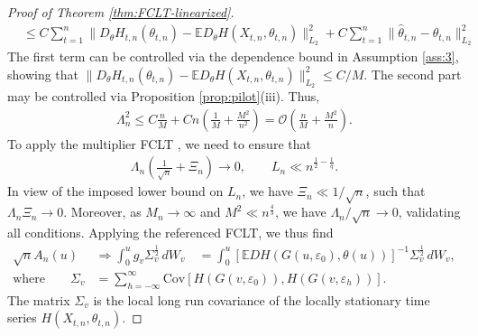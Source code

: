 \documentclass[10pt, a4paper]{article}
\theoremstyle{assumption}
\theoremstyle{definition}
\theoremstyle{theorem}
\newtheorem{theorem}{Theorem}[section]
\newcommand{\E}{\mathbb{E}}
\begin{document}
\begin{proof}[Proof of Theorem \ref{thm:FCLT-linearized}]
\begin{align*}
        &\leq C \sum_{t=1}^n \|D_\theta H_{t,n}({\theta}_{t,n}) - \E D_\theta H(X_{t,n},\theta_{t,n})\|_{L_2}^2 + C\sum_{t=1}^n \|\widehat{\theta}_{t,n}-\theta_{t,n}\|_{L_2}^2
    \end{align*}
    The first term can be controlled via the dependence bound in Assumption \ref{ass:3}, showing that $\|D_\theta H_{t,n}({\theta}_{t,n}) - \E D_\theta H(X_{t,n},\theta_{t,n})\|_{L_2}^2 \leq C/M$.
    The second part may be controlled via Proposition \ref{prop:pilot}(iii). 
    Thus,
    \begin{align*}
        \Lambda_n^2 \leq C \tfrac{n}{M} + C n \left(\tfrac{1}{M}+\tfrac{M^2}{n^2}\right) = \mathcal{O}\left( \tfrac{n}{M} + \tfrac{M^2}{n} \right).
    \end{align*}
    To apply the multiplier FCLT \citep[Thm.~5]{mies_strong_2025}, we need to ensure that
    \begin{align*}
        \Lambda_n \left( \tfrac{1}{\sqrt{n}} + \Xi_n \right) \to 0, \qquad L_n \ll n^{\frac{1}{2}-\frac{1}{q}}.
    \end{align*}
    In view of the imposed lower bound on $L_n$, we have $\Xi_n\ll 1/\sqrt{n}$, such that $\Lambda_n \Xi_n\to 0$. 
    Moreover, as $M_n\to\infty$ and $M^2\ll n^{\frac{4}{3}}$, we have $\Lambda_n / \sqrt{n}\to 0$, validating all conditions.
    Applying the referenced FCLT, we thus find
    \begin{align*}
        \sqrt{n}A_n(u) &\Rightarrow \int_0^u g_v \Sigma_v^{\frac{1}{2}}\, dW_v 
        \quad =\int_0^u [\E D H(G(u,\varepsilon_0), \theta(u))]^{-1} \Sigma_v^{\frac{1}{2}}\, dW_v,\\
        \text{where}\qquad \Sigma_v &= \sum_{h=-\infty}^\infty \text{Cov}\left[ H(G(v, \varepsilon_0)),H(G(v, \varepsilon_h)) \right].
    \end{align*}
    The matrix $\Sigma_v$ is the local long run covariance of the locally stationary time series $H(X_{t,n}, \theta_{t,n})$.
\end{proof}

\end{document}
